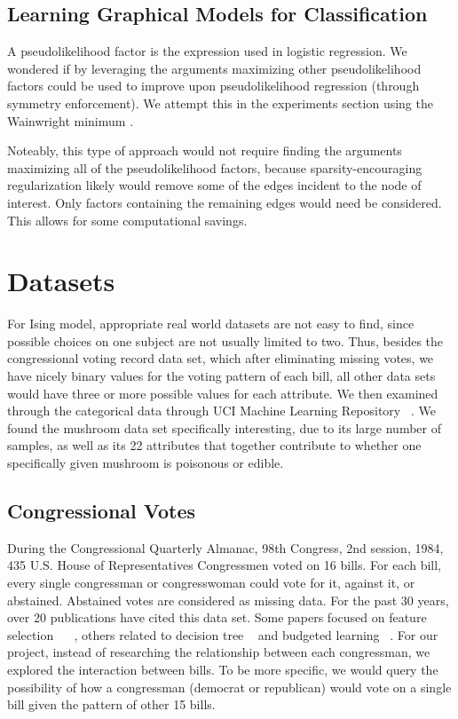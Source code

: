 \documentclass[11pt]{article}
\begin{document}
\subsection{Learning Graphical Models for Classification}
A pseudolikelihood factor is the expression used in logistic regression. We wondered if by leveraging the arguments maximizing other pseudolikelihood factors could be used to improve upon pseudolikelihood regression (through symmetry enforcement). We attempt this in the experiments section using the Wainwright minimum \cite{hoffling2009estimation}. 

Noteably, this type of approach would not require finding the arguments maximizing all of the pseudolikelihood factors, because sparsity-encouraging regularization likely would remove some of the edges incident to the node of interest. Only factors containing the remaining edges would need be considered. This allows for some computational savings.

\section{Datasets}

For Ising model, appropriate real world datasets are not easy to find, since possible choices on one subject are not usually limited to two. Thus, besides the congressional voting record data set, which after eliminating missing votes, we have nicely binary values for the voting pattern of each bill, all other data sets would have three or more possible values for each attribute. We then examined through the categorical data through UCI Machine Learning Repository ~\cite{Dua:2017}. We found the mushroom data set specifically interesting, due to its large number of samples, as well as its 22 attributes that together contribute to whether one specifically given mushroom is poisonous or edible.

\subsection{Congressional Votes}

During the Congressional Quarterly Almanac, 98th Congress, 2nd session, 1984, 435 U.S. House of Representatives Congressmen voted on 16 bills. For each bill, every single congressman or congresswoman could vote for it, against it, or abstained. Abstained votes are considered as missing data. For the past 30 years, over 20 publications have cited this data set. Some papers focused on feature selection ~\cite{Chun1999ANNigma} ~\cite{Huan1998Inc}, others related to decision tree ~\cite{Erin1995Fea} and budgeted learning ~\cite{Dan2012Bud}. For our project, instead of researching the relationship between each congressman, we explored the interaction between bills. To be more specific, we would query the possibility of how a congressman (democrat or republican) would vote on a single bill given the pattern of other 15 bills.
\end{document}

